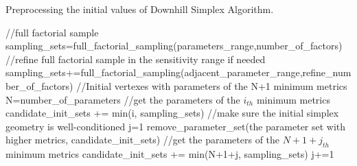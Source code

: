 \documentclass[gmd, manuscript]{copernicus}
\begin{document}
\begin{algorithm}[htb]
\caption{Preprocessing the initial values of Downhill Simplex Algorithm.} 
\label{alg:sequential-operation}
\begin{algorithmic}
\STATE //full factorial sample 
\STATE sampling\_sets=full\_factorial\_sampling(parameters\_range,number\_of\_factors) 
\STATE //refine full factorial sample in the sensitivity range if needed
\STATE sampling\_sets+=full\_factorial\_sampling(adjacent\_parameter\_range,refine\_number\_of\_factors)
\ENDIF
\STATE
\STATE //Initial vertexes with parameters of the N+1 minimum metrics
\STATE N=number\_of\_parameters 
\STATE //get the parameters of the $i_{th}$ minimum metrics
\STATE candidate\_init\_sets += min(i, sampling\_sets) 
\ENDFOR
\STATE
\STATE //make sure the initial simplex geometry is well-conditioned
\STATE j=1
\STATE remove\_parameter\_set(the parameter set with higher metrics, candidate\_init\_sets)
\STATE //get the parameters of the $N+1+j_{th}$ minimum metrics
\STATE candidate\_init\_sets += min(N+1+j, sampling\_sets)
\STATE j+=1
\ENDWHILE
\end{algorithmic}
\end{algorithm}








\end{document}
